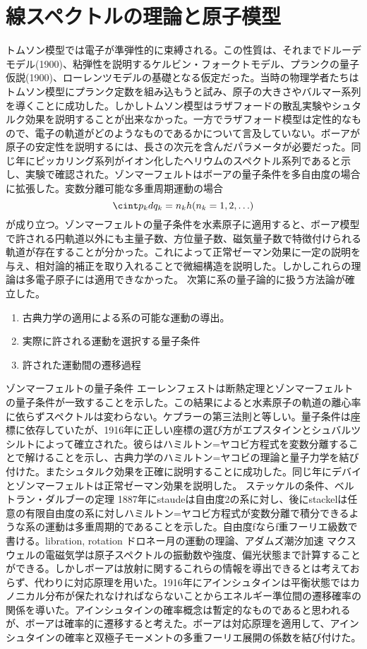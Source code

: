 \section{線スペクトルの理論と原子模型}
	トムソン模型では電子が準弾性的に束縛される。この性質は、それまでドルーデモデル(1900)、粘弾性を説明するケルビン・フォークトモデル、プランクの量子仮説(1900)、ローレンツモデルの基礎となる仮定だった。当時の物理学者たちはトムソン模型にプランク定数を組み込もうと試み、原子の大きさやバルマー系列を導くことに成功した。しかしトムソン模型はラザフォードの散乱実験やシュタルク効果を説明することが出来なかった。一方でラザフォード模型は定性的なもので、電子の軌道がどのようなものであるかについて言及していない。ボーアが原子の安定性を説明するには、長さの次元を含んだパラメータが必要だった。同じ年にピッカリング系列がイオン化したヘリウムのスペクトル系列であると示し、実験で確認された。ゾンマーフェルトはボーアの量子条件を多自由度の場合に拡張した。変数分離可能な多重周期運動の場合
		\[\cint p_kdq_k = n_kh(n_k = 1, 2, \ldots)\]
	が成り立つ。ゾンマーフェルトの量子条件を水素原子に適用すると、ボーア模型で許される円軌道以外にも主量子数、方位量子数、磁気量子数で特徴付けられる軌道が存在することが分かった。これによって正常ゼーマン効果に一定の説明を与え、相対論的補正を取り入れることで微細構造を説明した。しかしこれらの理論は多電子原子には適用できなかった。
	次第に系の量子論的に扱う方法論が確立した。
	\begin{enumerate}
		\item 古典力学の適用による系の可能な運動の導出。
		\item 実際に許される運動を選択する量子条件
		\item 許された運動間の遷移過程
	\end{enumerate}
ゾンマーフェルトの量子条件
エーレンフェストは断熱定理とゾンマーフェルトの量子条件が一致することを示した。この結果によると水素原子の軌道の離心率に依らずスペクトルは変わらない。ケプラーの第三法則と等しい。量子条件は座標に依存していたが、1916年に正しい座標の選び方がエプスタインとシュバルツシルトによって確立された。彼らはハミルトン=ヤコビ方程式を変数分離することで解けることを示し、古典力学のハミルトン=ヤコビの理論と量子力学を結び付けた。またシュタルク効果を正確に説明することに成功した。同じ年にデバイとゾンマーフェルトは正常ゼーマン効果を説明した。
ステッケルの条件、ベルトラン・ダルブーの定理
1887年にstaudeは自由度2の系に対し、後にstackelは任意の有限自由度の系に対しハミルトン=ヤコビ方程式が変数分離で積分できるような系の運動は多重周期的であることを示した。自由度fならf重フーリエ級数で書ける。libration, rotation ドロネー月の運動の理論、アダムズ潮汐加速
	マクスウェルの電磁気学は原子スペクトルの振動数や強度、偏光状態まで計算することができる。しかしボーアは放射に関するこれらの情報を導出できるとは考えておらず、代わりに対応原理を用いた。1916年にアインシュタインは平衡状態ではカノニカル分布が保たれなければならないことからエネルギー準位間の遷移確率の関係を導いた。アインシュタインの確率概念は暫定的なものであると思われるが、ボーアは確率的に遷移すると考えた。ボーアは対応原理を適用して、アインシュタインの確率と双極子モーメントの多重フーリエ展開の係数を結び付けた。

